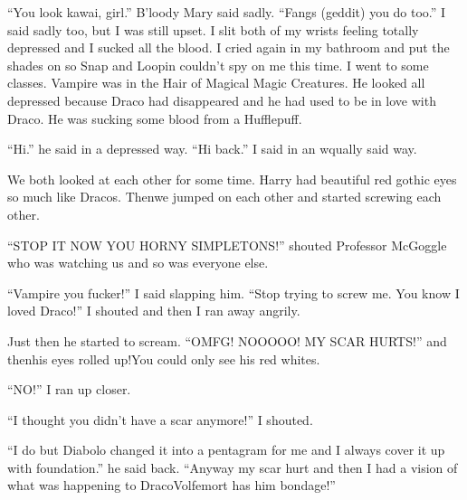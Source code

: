 \enquote{You look kawai, girl.} B'loody Mary said sadly. \enquote{Fangs (geddit) you do too.} I said sadly too, but I was still upset. I slit both of my wrists feeling totally depressed and I sucked all the blood. I cried again in my bathroom and put the shades on so Snap and Loopin couldn't spy on me this time. I went to some classes. Vampire was in the Hair of Magical Magic Creatures. He looked all depressed because Draco had disappeared and he had used to be in love with Draco. He was sucking some blood from a Hufflepuff.

\enquote{Hi.} he said in a depressed way. \enquote{Hi back.} I said in an wqually said way.

We both looked at each other for some time. Harry had beautiful red gothic eyes so much like Dracos. Then\dotfill\newline we jumped on each other and started screwing each other.

\enquote{STOP IT NOW YOU HORNY SIM\-PLE\-TONS\@!} shout\-ed Professor McGoggle who was watching us and so was everyone else.

\enquote{Vampire you fucker!} I said slapping him. \enquote{Stop trying to screw me. You know I loved Draco!} I shouted and then I ran away angrily.

Just then he started to scream. \enquote{OMFG\@! NOOOOO\@! MY SCAR HURTS\@!} and then\dotfill his eyes rolled up!\newline You could only see his red whites.

\enquote{NO!} I ran up closer.

\enquote{I thought you didn't have a scar anymore!} I shouted.

\enquote{I do but Diabolo changed it into a pentagram for me and I always cover it up with foundation.} he said back. \enquote{Anyway my scar hurt and then I had a vision of what was happening to Draco\dotfill\newline\phantom{}\dotfill Volfemort has him bondage!}


